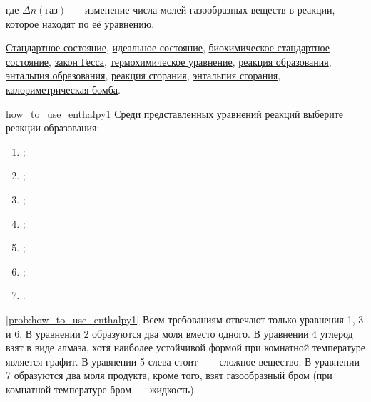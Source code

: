 где $\Delta n(\text{газ})$~--- изменение числа молей газообразных веществ в реакции, которое находят по её уравнению.

\begin{termlist}
    \hyperref[term:standard_state]{Стандартное состояние},
    \hyperref[term:ideal_state]{идеальное состояние},
    \hyperref[term:biochemical_standard_state]{биохимическое стандартное состояние},
    \hyperref[term:law_of_Hess]{закон Гесса},
    \hyperref[term:thermochemical_equation]{термохимическое уравнение},
    \hyperref[term:formation_reaction]{реакция образования},
    \hyperref[term:enthalpy_of_formation]{энтальпия образования},
    \hyperref[term:combustion_reaction]{реакция сгорания},
    \hyperref[term:enthalpy_of_combustion]{энтальпия сгорания},
    \hyperref[term:bomb_calorimeter]{калориметрическая бомба}.
\end{termlist}

\begin{problem}{}{how_to_use_enthalpy1}
    Среди представленных уравнений реакций выберите реакции образования:
    \begin{enumerate}[label=\arabic*)]
        \item {};
        \item {};
        \item {};
        \item {};
        \item {};
        \item {};
        \item {}.
    \end{enumerate}
    \begin{sol}{\ref{prob:how_to_use_enthalpy1}}
        Всем требованиям отвечают только уравнения 1, 3 и 6. В уравнении 2 образуются два моля  вместо одного. В уравнении 4 углерод взят в виде алмаза, хотя наиболее устойчивой формой при комнатной температуре является графит. В уравнении 5 слева стоит ~--- сложное вещество. В уравнении 7 образуются два моля продукта, кроме того, взят газообразный бром (при комнатной температуре бром~--- жидкость).
    \end{sol}
\end{problem}

